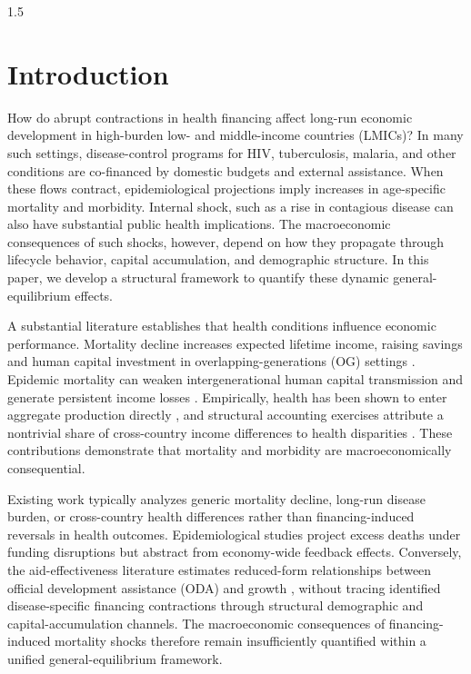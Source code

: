 \documentclass[letterpaper,12pt]{article}
\theoremstyle{definition}
\begin{document}
\begin{spacing}{1.5}


\newpage


\section{Introduction}
\label{SecIntro}

How do abrupt contractions in health financing affect long-run economic development in high-burden low- and middle-income countries (LMICs)? In many such settings, disease-control programs for HIV, tuberculosis, malaria, and other conditions are co-financed by domestic budgets and external assistance. When these flows contract, epidemiological projections imply increases in age-specific mortality and morbidity. Internal shock, such as a rise in contagious disease can also have substantial public health implications.  The macroeconomic consequences of such shocks, however, depend on how they propagate through lifecycle behavior, capital accumulation, and demographic structure. In this paper, we develop a structural framework to quantify these dynamic general-equilibrium effects.

A substantial literature establishes that health conditions influence economic performance. Mortality decline increases expected lifetime income, raising savings and human capital investment in overlapping-generations (OG) settings \citep{kalemli-ozcan2000}. Epidemic mortality can weaken intergenerational human capital transmission and generate persistent income losses \citep{bell2006}. Empirically, health has been shown to enter aggregate production directly \citep{bloom2004}, and structural accounting exercises attribute a nontrivial share of cross-country income differences to health disparities \citep{Weil2007}. These contributions demonstrate that mortality and morbidity are macroeconomically consequential.

Existing work typically analyzes generic mortality decline, long-run disease burden, or cross-country health differences rather than financing-induced reversals in health outcomes. Epidemiological studies project excess deaths under funding disruptions but abstract from economy-wide feedback effects. Conversely, the aid-effectiveness literature estimates reduced-form relationships between official development assistance (ODA) and growth \citep[e.g.,][]{BurnsideDollar:2000}, without tracing identified disease-specific financing contractions through structural demographic and capital-accumulation channels. The macroeconomic consequences of financing-induced mortality shocks therefore remain insufficiently quantified within a unified general-equilibrium framework.


\end{spacing}
\end{document}
